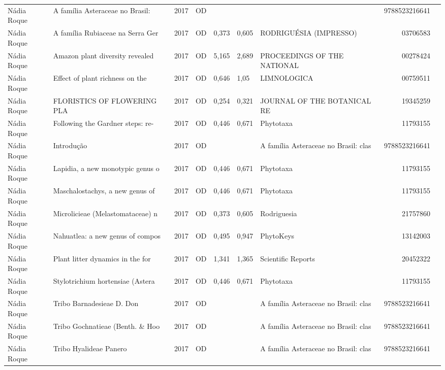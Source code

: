\documentclass[12pt,brazil]{article}\usepackage[]{graphicx}\usepackage[]{xcolor}
\begin{document}
\begin{longtable}{lllrrllrr}
Nádia Roque & A família Asteraceae no Brasil:  & 2017 & OD &  &  &  & 9788523216641 \\
Nádia Roque & A família Rubiaceae na Serra Ger & 2017 & OD & 0,373 & 0,605 & RODRIGUÉSIA (IMPRESSO) & 03706583 \\
Nádia Roque & Amazon plant diversity revealed  & 2017 & OD & 5,165 & 2,689 & PROCEEDINGS OF THE NATIONAL & 00278424 \\
Nádia Roque & Effect of plant richness on the  & 2017 & OD & 0,646 & 1,05 & LIMNOLOGICA & 00759511 \\
\rowcolor{coautr}\rowcolor{coautr}\rowcolor{coautr}\rowcolor{coautr}\rowcolor{coautr}\rowcolor{coautr}\rowcolor{coautr}\rowcolor{coautr}\rowcolor{coautr}\rowcolor{coautr}\rowcolor{coautr}\rowcolor{coautr}\rowcolor{coautr}\rowcolor{coautr}\rowcolor{coautr}\rowcolor{coautr}Nádia Roque & FLORISTICS OF FLOWERING PLA & 2017 & OD & 0,254 & 0,321 & JOURNAL OF THE BOTANICAL RE & 19345259 \\
Nádia Roque & Following the Gardner steps: re- & 2017 & OD & 0,446 & 0,671 & Phytotaxa & 11793155 \\
Nádia Roque & Introdução & 2017 & OD &  &  & A família Asteraceae no Brasil: clas & 9788523216641 \\
Nádia Roque & Lapidia, a new monotypic genus o & 2017 & OD & 0,446 & 0,671 & Phytotaxa & 11793155 \\
Nádia Roque & Maschalostachys, a new genus of  & 2017 & OD & 0,446 & 0,671 & Phytotaxa & 11793155 \\
Nádia Roque & Microlicieae (Melastomataceae) n & 2017 & OD & 0,373 & 0,605 & Rodriguesia & 21757860 \\
Nádia Roque & Nahuatlea: a new genus of compos & 2017 & OD & 0,495 & 0,947 & PhytoKeys & 13142003 \\
Nádia Roque & Plant litter dynamics in the for & 2017 & OD & 1,341 & 1,365 & Scientific Reports & 20452322 \\
Nádia Roque & Stylotrichium hortensiae (Astera & 2017 & OD & 0,446 & 0,671 & Phytotaxa & 11793155 \\
Nádia Roque & Tribo Barnadesieae D. Don & 2017 & OD &  &  & A família Asteraceae no Brasil: clas & 9788523216641 \\
Nádia Roque & Tribo Gochnatieae (Benth. \& Hoo & 2017 & OD &  &  & A família Asteraceae no Brasil: clas & 9788523216641 \\
Nádia Roque & Tribo Hyalideae Panero & 2017 & OD &  &  & A família Asteraceae no Brasil: clas & 9788523216641 \\

\end{longtable}
\end{document}
